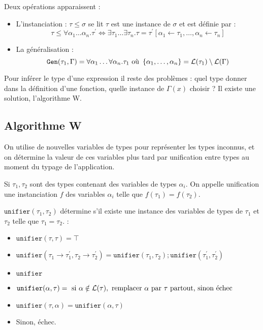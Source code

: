 \documentclass{cours}
\begin{document}
Deux opérations apparaissent : 
\begin{itemize}
    \item L'instanciation : $\tau \leq \sigma$ se lit $\tau$ est une instance de $\sigma$ et est définie par : 
    \[
        \tau \leq \forall\alpha_{1}\ldots\alpha_{n}.\tau^{'} \Leftrightarrow \exists\tau_{1}\ldots\exists\tau_{n}.\tau = \tau^{'}\left[\alpha_{1}\leftarrow\tau_{1}, \ldots, \alpha_{n} \leftarrow \tau_{n}\right]
    \]
    \item La généralisation : 
    \[
        \texttt{Gen}(\tau_{1}, \Gamma) = \forall\alpha_{1}\ldots\forall\alpha_{n}.\tau_{1} \text{ où } \left\{\alpha_{1}, \ldots, \alpha_{n}\right\} = \mathcal{L}(\tau_{1}) \setminus \mathcal{L}(\Gamma)
    \]
\end{itemize}

Pour inférer le type d'une expression il reste des problèmes : quel type donner dans la définition d'une fonction, quelle instance de $\Gamma(x)$ choisir ? Il existe une solution, l'algorithme W.
\subsection{Algorithme W}
On utilise de nouvelles variables de types pour représenter les types inconnus, et on détermine la valeur de ces variables plus tard par unification entre types au moment du typage de l'application. 
\begin{definition}
    Si $\tau_{1}, \tau_{2}$ sont des types contenant des variables de types $\alpha_{i}$. On appelle unification une instanciation $f$ des variables $\alpha_{i}$ telle que $f(\tau_{1}) = f(\tau_{2})$. 
\end{definition}

\begin{definition}
    $\texttt{unifier}(\tau_{1}, \tau_{2})$ détermine s'il existe une instance des variables de types de $\tau_{1}$ et $\tau_{2}$ telle que $\tau_{1} = \tau_{2}$. :
    \begin{itemize}
        \item $\texttt{unifier}(\tau, \tau) = \top$ 
        \item $\texttt{unifier}(\tau_{1} \rightarrow \tau_{1}^{'}, \tau_{2} \rightarrow \tau_{2}^{'}) = \texttt{unifier}(\tau_{1}, \tau_{2}); \texttt{unifier}(\tau_{1}^{'}, \tau_{2}^{'})$
        \item $\texttt{unifier}$
        \item $\texttt{unifier}(\alpha, \tau) = \text{ si } \alpha \notin \mathcal{L}(\tau), \text{ remplacer } \alpha \text{ par } \tau \text{ partout, sinon échec}$
        \item $\texttt{unifier}(\tau, \alpha) = \texttt{unifier}(\alpha, \tau)$
        \item Sinon, échec.
    \end{itemize}
\end{definition}
\end{document}
